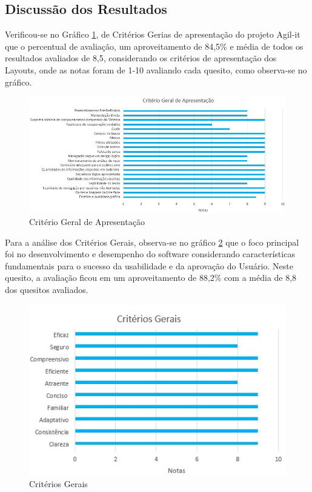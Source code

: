 \subsection{Discussão dos Resultados}

Verificou-se no Gráfico \ref{criterio-geral-apresentacao}, de Critérios Gerias de apresentação do projeto Agil-it que o percentual de avaliação, um aproveitamento de 84,5\% e média de todos os resultados avaliados de 8,5, considerando os critérios de apresentação dos Layouts, onde as notas foram de 1-10 avaliando cada quesito, como observa-se no gráfico.

\begin{figure}[H]
	\caption{\label{criterio-geral-apresentacao}Critério Geral de Apresentação}
	\begin{center}
		\includegraphics[scale=0.60]{./Figuras/cap-8/criterio-geral-apresentacao.jpeg}
	\end{center}
\end{figure}

Para a análise dos Critérios Gerais, observa-se no gráfico \ref{criterios-gerais} que o foco principal foi no desenvolvimento e desempenho do software considerando características fundamentais para o sucesso da usabilidade e da aprovação do Usuário. Neste quesito, a avaliação ficou em um aproveitamento de 88,2\% com a média de 8,8 dos quesitos avaliados.

\begin{figure}[H]
	\caption{\label{criterios-gerais}Critérios Gerais}
	\begin{center}
		\includegraphics[scale=0.86]{./Figuras/cap-8/criterios-gerais.jpeg}
	\end{center}
\end{figure}

